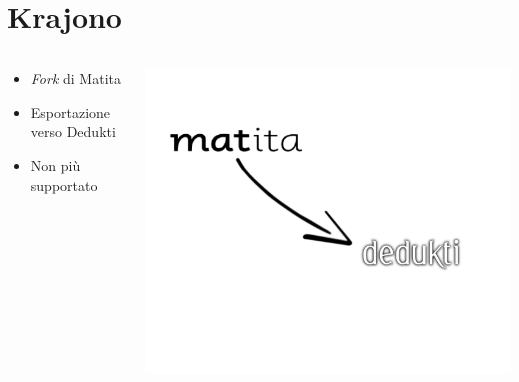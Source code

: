 \documentclass{beamer}
\begin{document}
\section{Krajono}
\begin{frame}

\begin{columns}
\begin{column}{.5\textwidth}
\begin{itemize}
  \item \textit{Fork } di Matita 
  \vspace{1.5em}
  \item Esportazione verso Dedukti
  \vspace{1.5em}
  \item Non più supportato
\end{itemize}
\end{column}
\begin{column}{.5\textwidth}
\includegraphics[scale=0.40]{m2d.png}
\end{column}
\end{columns}

\end{frame}
\end{document}
